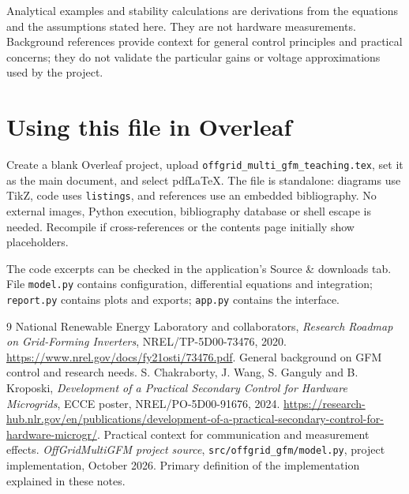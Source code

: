 \documentclass[11pt,a4paper]{article}
\begin{document}
Analytical examples and stability calculations are derivations from the equations and the assumptions stated here. They are not hardware measurements. Background references provide context for general control principles and practical concerns; they do not validate the particular gains or voltage approximations used by the project.

\section{Using this file in Overleaf}
Create a blank Overleaf project, upload \texttt{offgrid\_multi\_gfm\_teaching.tex}, set it as the main document, and select pdfLaTeX. The file is standalone: diagrams use TikZ, code uses \texttt{listings}, and references use an embedded bibliography. No external images, Python execution, bibliography database or shell escape is needed. Recompile if cross-references or the contents page initially show placeholders.

The code excerpts can be checked in the application's Source \& downloads tab. File \texttt{model.py} contains configuration, differential equations and integration; \texttt{report.py} contains plots and exports; \texttt{app.py} contains the interface.

\begin{thebibliography}{9}
National Renewable Energy Laboratory and collaborators,
\emph{Research Roadmap on Grid-Forming Inverters}, NREL/TP-5D00-73476, 2020.
\url{https://www.nrel.gov/docs/fy21osti/73476.pdf}.
General background on GFM control and research needs.
S. Chakraborty, J. Wang, S. Ganguly and B. Kroposki,
\emph{Development of a Practical Secondary Control for Hardware Microgrids},
ECCE poster, NREL/PO-5D00-91676, 2024.
\url{https://research-hub.nlr.gov/en/publications/development-of-a-practical-secondary-control-for-hardware-microgr/}.
Practical context for communication and measurement effects.
\emph{OffGridMultiGFM project source}, \texttt{src/offgrid\_gfm/model.py}, project implementation, October 2026.
Primary definition of the implementation explained in these notes.
\end{thebibliography}
\end{document}
